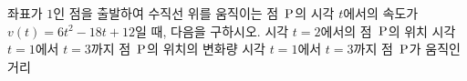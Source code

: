 좌표가 $1$인 점을 출발하여 수직선 위를 움직이는 점~$\mathrm{P}$의 시각 $t$에서의 속도가 $v(t)=6t^2-18t+12$일 때, 다음을 구하시오.
 시각 $t=2$에서의 점~$\mathrm{P}$의 위치
 시각 $t=1$에서 $t=3$까지 점~$\mathrm{P}$의 위치의 변화량
 시각 $t=1$에서 $t=3$까지 점~$\mathrm{P}$가 움직인 거리
